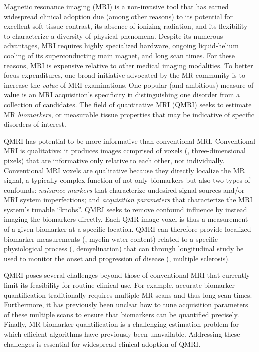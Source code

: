 
Magnetic resonance imaging (MRI)
is a non-invasive tool
that has earned widespread clinical adoption
due (among other reasons) 
to its potential for excellent soft tissue contrast,
its absence of ionizing radiation,
and its flexibility to characterize 
a diversity of physical phenomena. 
Despite its numerous advantages,
MRI requires highly specialized hardware,
ongoing liquid-helium cooling
of its superconducting main magnet,
and long scan times.
For these reasons,
MRI is expensive relative
to other medical imaging modalities.
To better focus expenditures,
one broad initiative advocated by the MR community 
is to increase the \emph{value}
of MRI examinations.
One popular (and ambitious) measure of value
is an MRI acquisition's specificity
in distinguishing one disorder
from a collection of candidates.
The field of quantitative MRI (QMRI)
seeks to estimate MR \emph{biomarkers},
or measurable tissue properties
that may be indicative 
of specific disorders of interest.

QMRI has potential
to be more informative than conventional MRI.
Conventional MRI is qualitative:
it produces images comprised of voxels
(\ie, three-dimensional pixels)
that are informative only relative to each other,
not individually.
Conventional MRI voxels are qualitative
because they directly localize the MR signal,
a typically complex function
of not only biomarkers
but also two types of confounds:
\emph{nuisance markers}
that characterize undesired signal sources
and/or MRI system imperfections;
and \emph{acquisition parameters}
that characterize the MRI system's tunable ``knobs''. 
QMRI seeks to remove confound influence
by instead imaging the biomarkers directly.
Each QMR image voxel
is thus a measurement 
of a given biomarker
at a specific location.
QMRI can therefore provide localized biomarker measurements
(\eg, myelin water content)
related to a specific physiological process
(\eg, demyelination)
that can through longitudinal study
be used to monitor the onset and progression of disease
(\eg, multiple sclerosis).

QMRI poses several challenges
beyond those of conventional MRI 
that currently limit its feasibility 
for routine clinical use.
For example,
accurate biomarker quantification 
traditionally requires multiple MR scans
and thus long scan times.
Furthermore,
it has previously been unclear
how to tune acquisition parameters 
of these multiple scans
to ensure that biomarkers can be quantified precisely.
Finally, MR biomarker quantification
is a challenging estimation problem
for which efficient algorithms
have previously been unavailable.
Addressing these challenges is essential
for widespread clinical adoption of QMRI.

